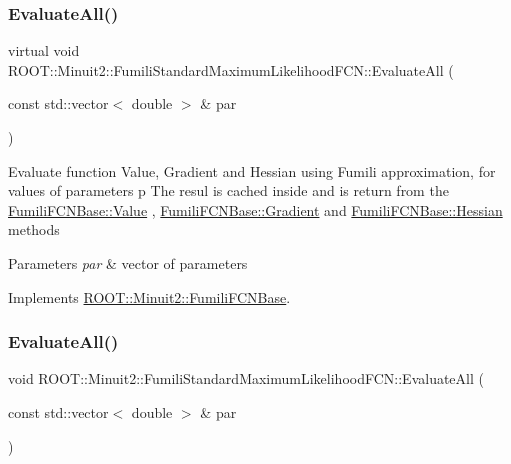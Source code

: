 \subsubsection{\texorpdfstring{EvaluateAll()}{EvaluateAll()}\hspace{0.1cm}{\footnotesize\ttfamily [1/3]}}
{\footnotesize\ttfamily virtual void R\+O\+O\+T\+::\+Minuit2\+::\+Fumili\+Standard\+Maximum\+Likelihood\+F\+C\+N\+::\+Evaluate\+All (\begin{DoxyParamCaption}\item[{const std\+::vector$<$ double $>$ \&}]{par }\end{DoxyParamCaption})\hspace{0.3cm}{\ttfamily [virtual]}}

Evaluate function Value, Gradient and Hessian using Fumili approximation, for values of parameters p The resul is cached inside and is return from the \mbox{\hyperlink{classROOT_1_1Minuit2_1_1FumiliFCNBase_a221dacee0ccde747a271a0cecd759f98}{Fumili\+F\+C\+N\+Base\+::\+Value}} , \mbox{\hyperlink{classROOT_1_1Minuit2_1_1FumiliFCNBase_ad226939ea2e83f754b5a6afc30876d3e}{Fumili\+F\+C\+N\+Base\+::\+Gradient}} and \mbox{\hyperlink{classROOT_1_1Minuit2_1_1FumiliFCNBase_ade134d8c6613393e942ef98d445db376}{Fumili\+F\+C\+N\+Base\+::\+Hessian}} methods


\begin{DoxyParams}{Parameters}
{\em par} & vector of parameters \\
\hline
\end{DoxyParams}


Implements \mbox{\hyperlink{classROOT_1_1Minuit2_1_1FumiliFCNBase_a0741bb4a7405cc33ab60583472a189cb}{R\+O\+O\+T\+::\+Minuit2\+::\+Fumili\+F\+C\+N\+Base}}.

\mbox{\label{classROOT_1_1Minuit2_1_1FumiliStandardMaximumLikelihoodFCN_a1faea776f7da3c238e522748b573caab}} 
\subsubsection{\texorpdfstring{EvaluateAll()}{EvaluateAll()}\hspace{0.1cm}{\footnotesize\ttfamily [2/3]}}
{\footnotesize\ttfamily void R\+O\+O\+T\+::\+Minuit2\+::\+Fumili\+Standard\+Maximum\+Likelihood\+F\+C\+N\+::\+Evaluate\+All (\begin{DoxyParamCaption}\item[{const std\+::vector$<$ double $>$ \&}]{par }\end{DoxyParamCaption})\hspace{0.3cm}{\ttfamily [virtual]}}

